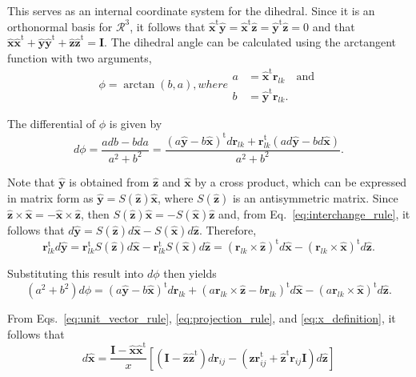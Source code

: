\documentclass[11pt]{article}
\newcommand{\mt}[1]{\boldsymbol{\mathbf{#1}}}           %
\newcommand{\vt}[1]{\boldsymbol{\mathbf{#1}}}           %
\newcommand{\tr}[1]{#1^\text{t}}                        %
\begin{document}
This serves as an internal coordinate system for the dihedral. Since it is an orthonormal basis for $\mathcal{R}^3$, it follows that $\tr{\hat{\vt x}}\hat{\vt y} = \tr{\hat{\vt x}}\hat{\vt z} = \tr{\hat{\vt y}}\hat{\vt z} = 0$ and that $\hat{\vt x}\tr{\hat{\vt x}} + \hat{\vt y}\tr{\hat{\vt y}} + \hat{\vt z}\tr{\hat{\vt z}} = {\mt I}$. The dihedral angle can be calculated using the arctangent function with two arguments,
\begin{subequations}
\begin{equation}
\phi = \arctan(b,a),
\end{equation}
where
\begin{align}
a &= \tr{\hat{\vt x}}{\vt r}_{lk} \quad \text{and}\\
b &= \tr{\hat{\vt y}}{\vt r}_{lk}.
\end{align}
\end{subequations}

The differential of $\phi$ is given by
\[
d\phi = \frac{a db - b da}{a^2 + b^2} = \frac{\tr{(a\hat{\vt y}-b\hat{\vt x})}d{\vt r}_{lk} + \tr{{\vt r}_{lk}}(a d\hat{\vt y} - b d\hat{\vt x})}{a^2 + b^2}.
\]

Note that $\hat{\vt y}$ is obtained from $\hat{\vt z}$ and $\hat{\vt x}$ by a cross product, which can be expressed in matrix form as $\hat{\vt y} = S(\hat{\vt z})\hat{\vt x}$, where $S(\hat{\vt z})$ is an antisymmetric matrix. Since $\hat{\vt z} \times \hat{\vt x} = - \hat{\vt x} \times \hat{\vt z}$, then $S(\hat{\vt z})\hat{\vt x} = - S(\hat{\vt x})\hat{\vt z}$ and, from Eq.~\ref{eq:interchange_rule}, it follows that $d\hat{\vt y} = S(\hat{\vt z})d\hat{\vt x} - S(\hat{\vt x})d\hat{\vt z}$. Therefore,
\[
\tr{{\vt r}_{lk}}d\hat{\vt y} = \tr{{\vt r}_{lk}}S(\hat{\vt z})d\hat{\vt x} - \tr{{\vt r}_{lk}}S(\hat{\vt x})d\hat{\vt z} = \tr{({\vt r}_{lk} \times \hat{\vt z})}d\hat{\vt x} - \tr{({\vt r}_{lk} \times \hat{\vt x})}d\hat{\vt z}.
\]

Substituting this result into $d\phi$ then yields
\[
(a^2 + b^2)d\phi = \tr{\left(a\hat{\vt y} - b\hat{\vt x}\right)}d{\vt r}_{lk}
+ \tr{\left(a{\vt r}_{lk} \times \hat{\vt z} - b{\vt r}_{lk}\right)}d\hat{\vt x}
- \tr{\left(a{\vt r}_{lk} \times \hat{\vt x}\right)}d\hat{\vt z}.
\]

From Eqs.~\ref{eq:unit_vector_rule}, \ref{eq:projection_rule}, and \ref{eq:x_definition}, it follows that
\[
d\hat{\vt x} = \frac{\mt I - \hat{\vt x}\tr{\hat{\vt x}}}{x} \left[ (\mt I - \hat{\vt z}\tr{\hat{\vt z}})d{\vt r}_{ij} - (\hat{\vt z}\tr{{\vt r}_{ij}} + \tr{\hat{\vt z}} {\vt r}_{ij} \mt I) d\hat{\vt z} \right]
\]
\end{document}
